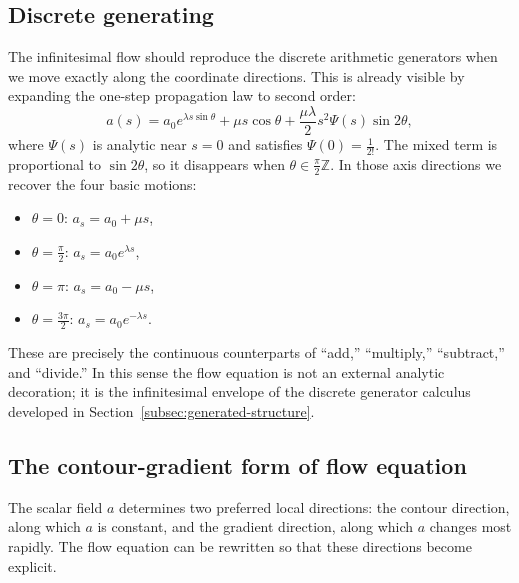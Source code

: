 \subsection{Discrete generating}\label{subsec:discrete-generating}

The infinitesimal flow should reproduce the discrete arithmetic generators when we move exactly along the coordinate directions. This is already visible by expanding the one-step propagation law to second order:
\[
    a(s)=a_0 e^{\lambda s\sin\theta} + \mu s\cos\theta + \frac{\mu\lambda}{2}s^2\Psi(s)\sin 2\theta,
\]
where $\Psi(s)$ is analytic near $s=0$ and satisfies $\Psi(0)=\frac{1}{2!}$. The mixed term is proportional to $\sin 2\theta$, so it disappears when $\theta\in \frac{\pi}{2}\mathbb{Z}$. In those axis directions we recover the four basic motions:
\begin{itemize}
\item $\theta = 0$: $a_s = a_0 + \mu s$,
\item $\theta = \frac{\pi}{2}$: $a_s = a_0 e^{\lambda s}$,
\item $\theta = \pi$: $a_s = a_0 - \mu s$,
\item $\theta = \frac{3\pi}{2}$: $a_s = a_0 e^{-\lambda s}$.
\end{itemize}
These are precisely the continuous counterparts of ``add,'' ``multiply,'' ``subtract,'' and ``divide.'' In this sense the flow equation is not an external analytic decoration; it is the infinitesimal envelope of the discrete generator calculus developed in Section~\ref{subsec:generated-structure}.

\subsection{The contour-gradient form of flow equation}\label{subsec:the-contour-gradient-form}

The scalar field $a$ determines two preferred local directions: the contour direction, along which $a$ is constant, and the gradient direction, along which $a$ changes most rapidly. The flow equation can be rewritten so that these directions become explicit.

